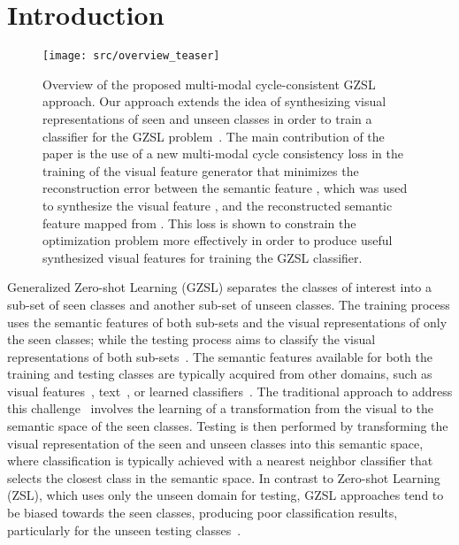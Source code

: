 \documentclass[runningheads]{llncs}
\begin{document}
\section{Introduction}

\begin{figure}[h]
\centering
\texttt{[image: src/overview\_teaser]}
\caption{Overview of the proposed multi-modal cycle-consistent GZSL approach. Our approach extends the idea of synthesizing  visual representations of seen and unseen classes in order to train a classifier for the GZSL problem~\cite{XianCVPR2018}.  The main contribution of the paper is the use of a new multi-modal cycle consistency loss in the training of the visual feature generator that 
minimizes the reconstruction error between the semantic feature , which was used to synthesize the visual feature , and the reconstructed semantic feature  mapped from .  This loss is shown to constrain the optimization problem more effectively in order to produce useful synthesized visual features for training the GZSL classifier.}
\label{eq:cycle_teaser}

\end{figure}

\let\thefootnote\relax{}

Generalized Zero-shot Learning (GZSL) separates the classes of interest into a sub-set of seen classes and another sub-set of unseen classes.  The training process uses the semantic features of both sub-sets and the visual representations of only the seen classes; while the testing process aims to classify the visual representations of both sub-sets~\cite{XianCVPR2017,zhang2015zero}. The semantic features available for both the training and testing classes are typically acquired from other domains, such as visual features~\cite{lampert2014attribute}, text~\cite{qiao2016less,socher2013zero,zhang2015zero}, or learned classifiers~\cite{yu2013designing}. The traditional approach to address this challenge~\cite{XianCVPR2017} involves the learning of a transformation from the visual to the semantic space of the seen classes.  Testing is then performed by transforming the visual representation of the seen and unseen classes into this semantic space, where classification is typically achieved with a nearest neighbor classifier that selects the closest class in the semantic space. In contrast to Zero-shot Learning (ZSL), which uses only the unseen domain for testing, GZSL approaches tend to be biased towards the seen classes, producing poor classification results, particularly for the unseen testing classes~\cite{XianCVPR2018}. 
\end{document}
